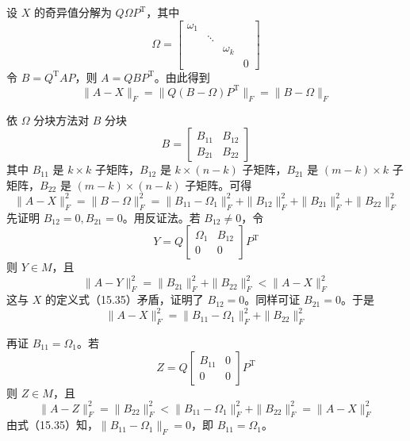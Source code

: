 \documentclass[UTF8,12pt,a4paper,fontset=fandol]{ctexart}
\begin{document}
设 $X$ 的奇异值分解为 $Q\Omega P^{\mathrm{T}}$，其中
\[
\Omega=
\begin{bmatrix}
\omega_1&&&\\
&\ddots&&\\
&&\omega_k&\\
&&&0
\end{bmatrix}
\]
令 $B=Q^{\mathrm{T}}AP$，则 $A=QBP^{\mathrm{T}}$。由此得到
\begin{equation}
\|A-X\|_F=\|Q(B-\Omega)P^{\mathrm{T}}\|_F=\|B-\Omega\|_F
\tag{15.36}
\end{equation}

依 $\Omega$ 分块方法对 $B$ 分块
\[
B=
\begin{bmatrix}
B_{11}&B_{12}\\
B_{21}&B_{22}
\end{bmatrix}
\]
其中 $B_{11}$ 是 $k\times k$ 子矩阵，$B_{12}$ 是 $k\times(n-k)$ 子矩阵，$B_{21}$ 是 $(m-k)\times k$ 子矩阵，$B_{22}$ 是 $(m-k)\times(n-k)$ 子矩阵。可得
\begin{equation}
\|A-X\|_F^2=\|B-\Omega\|_F^2
=\|B_{11}-\Omega_1\|_F^2+\|B_{12}\|_F^2+\|B_{21}\|_F^2+\|B_{22}\|_F^2
\tag{15.37}
\end{equation}
先证明 $B_{12}=0,B_{21}=0$。用反证法。若 $B_{12}\neq0$，令
\[
Y=Q
\begin{bmatrix}
\Omega_1&B_{12}\\
0&0
\end{bmatrix}
P^{\mathrm{T}}
\]
则 $Y\in M$，且
\begin{equation}
\|A-Y\|_F^2=\|B_{21}\|_F^2+\|B_{22}\|_F^2<\|A-X\|_F^2
\tag{15.38}
\end{equation}
这与 $X$ 的定义式（15.35）矛盾，证明了 $B_{12}=0$。同样可证 $B_{21}=0$。于是
\begin{equation}
\|A-X\|_F^2=\|B_{11}-\Omega_1\|_F^2+\|B_{22}\|_F^2
\tag{15.39}
\end{equation}

再证 $B_{11}=\Omega_1$。若
\[
Z=Q
\begin{bmatrix}
B_{11}&0\\
0&0
\end{bmatrix}
P^{\mathrm{T}}
\]
则 $Z\in M$，且
\begin{equation}
\|A-Z\|_F^2=\|B_{22}\|_F^2<\|B_{11}-\Omega_1\|_F^2+\|B_{22}\|_F^2=\|A-X\|_F^2
\tag{15.40}
\end{equation}
由式（15.35）知，$\|B_{11}-\Omega_1\|_F=0$，即 $B_{11}=\Omega_1$。
\end{document}
